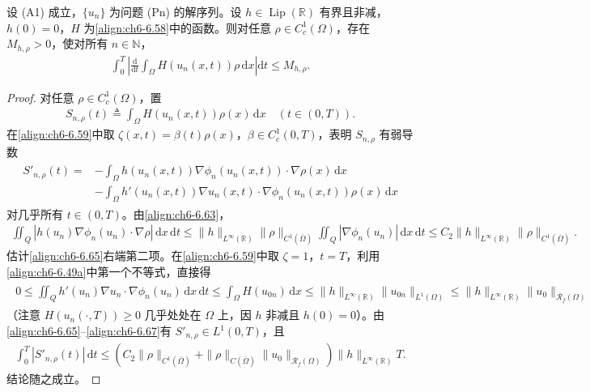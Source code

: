 \documentclass[../../main.tex]{subfiles}%
\begin{document}
\begin{lemma}\label{lemma:ch06-6.5.6}
设 (A1) 成立，$\{u_n\}$ 为问题 (Pn) 的解序列。设 $h\in\operatorname{Lip}(\mathbb{R})$ 有界且非减，$h(0)=0$，$H$ 为\eqref{align:ch6-6.58}中的函数。则对任意 $\rho\in C^1_c(\Omega)$，存在 $M_{h,\rho}>0$，使对所有 $n\in\mathbb{N}$，
\begin{align}
\int_0^T\left|\frac{\mathrm{d}}{\mathrm{d}t}\int_\Omega H(u_n(x,t))\rho\,\mathrm{d}x\right|\mathrm{d}t\leqslant M_{h,\rho}. \label{align:ch6-6.64}
\end{align}
\end{lemma}

\begin{proof}
对任意 $\rho\in C^1_c(\Omega)$，置
\begin{align*}
S_{n,\rho}(t)\triangleq \int_\Omega H(u_n(x,t))\rho(x)\,\mathrm{d}x \quad(t\in(0,T)).
\end{align*}
在\eqref{align:ch6-6.59}中取 $\zeta(x,t)=\beta(t)\rho(x)$，$\beta\in C^1_c(0,T)$，表明 $S_{n,\rho}$ 有弱导数
\begin{align}
\begin{aligned}
S'_{n,\rho}(t)
={}&-\int_\Omega h(u_n(x,t))\nabla\phi_n(u_n(x,t))\cdot\nabla\rho(x)\,\mathrm{d}x\\
&-\int_\Omega h'(u_n(x,t))\nabla u_n(x,t)\cdot\nabla\phi_n(u_n(x,t))\rho(x)\,\mathrm{d}x
\end{aligned} \label{align:ch6-6.65}
\end{align}
对几乎所有 $t\in(0,T)$。由\eqref{align:ch6-6.63}，
\begin{align}
\iint_Q|h(u_n)\nabla\phi_n(u_n)\cdot\nabla\rho|\,\mathrm{d}x\,\mathrm{d}t
\leqslant\|h\|_{L^\infty(\mathbb{R})}\|\rho\|_{C^1(\overline\Omega)}
\iint_Q|\nabla\phi_n(u_n)|\,\mathrm{d}x\,\mathrm{d}t
\leqslant C_2\|h\|_{L^\infty(\mathbb{R})}\|\rho\|_{C^1(\overline\Omega)}. \label{align:ch6-6.66}
\end{align}
估计\eqref{align:ch6-6.65}右端第二项。在\eqref{align:ch6-6.59}中取 $\zeta=1$，$t=T$，利用\eqref{align:ch6-6.49a}中第一个不等式，直接得
\begin{align}
\begin{aligned}
0\leqslant\iint_Q h'(u_n)\nabla u_n\cdot\nabla\phi_n(u_n)\,\mathrm{d}x\,\mathrm{d}t
\leqslant\int_\Omega H(u_{0n})\,\mathrm{d}x
\leqslant\|h\|_{L^\infty(\mathbb{R})}\|u_{0n}\|_{L^1(\Omega)}
\leqslant\|h\|_{L^\infty(\mathbb{R})}\|u_0\|_{\mathscr{R}_f(\Omega)}
\end{aligned} \label{align:ch6-6.67}
\end{align}
（注意 $H(u_n(\cdot,T))\geqslant0$ 几乎处处在 $\Omega$ 上，因 $h$ 非减且 $h(0)=0$）。由\eqref{align:ch6-6.65}--\eqref{align:ch6-6.67}有 $S'_{n,\rho}\in L^1(0,T)$，且
\begin{align}
\int_0^T|S'_{n,\rho}(t)|\,\mathrm{d}t
\leqslant(C_2\|\rho\|_{C^1(\overline\Omega)}+\|\rho\|_{C(\overline\Omega)}\|u_0\|_{\mathscr{R}_f(\Omega)})
\|h\|_{L^\infty(\mathbb{R})}T. \label{align:ch6-6.68}
\end{align}
结论随之成立。
\end{proof}
\end{document}
